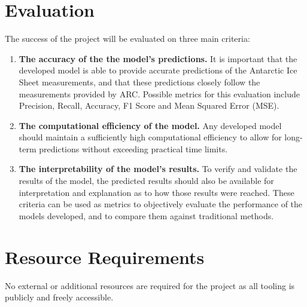\section{Evaluation}

The success of the project will be evaluated on three main criteria: 

\begin{enumerate}
    \item \textbf{The accuracy of the the model’s predictions.} It is important that the developed model is able to provide accurate predictions of the Antarctic Ice Sheet measurements, and that these predictions closely follow the measurements provided by ARC. Possible metrics for this evaluation include Precision, Recall, Accuracy, F1 Score and Mean Squared Error (MSE).

    \item \textbf{The computational efficiency of the model. }Any developed model should maintain a sufficiently high computational efficiency to allow for long-term predictions without exceeding practical time limits.

    \item \textbf{The interpretability of the model’s results.} To verify and validate the results of the model, the predicted results should also be available for interpretation and explanation as to how those results were reached. These criteria can be used as metrics to objectively evaluate the performance of the models developed, and to compare them against traditional methods.
\end{enumerate}

\section{Resource Requirements}
No external or additional resources are required for the project as all tooling is publicly and freely accessible.  